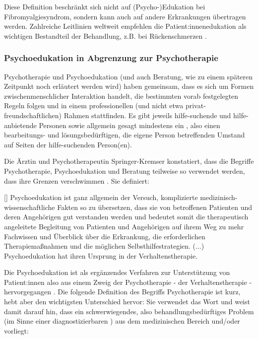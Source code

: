 \documentclass[
  twoside,
  parskip=half-,
  paper=176mm:246mm,
  BCOR=14mm,
  DIV=14,
]{scrreprt}
\makeatletter
\renewenvironment*{displayquote}
  {\begingroup\setlength{\leftmargini}{0pt}\csq@getcargs{\csq@bdquote{}{}}}
  {\csq@edquote\endgroup}
\makeatother
\begin{document}
Diese Definition beschränkt sich nicht auf (Psycho-)Edukation bei Fibromyalgiesyndrom, sondern 
kann auch auf andere Erkrankungen übertragen werden. Zahlreiche Leitlinien weltweit empfehlen die Patient:innenedukation als wichtigen Bestandteil der Behandlung, z.B. bei Rückenschmerzen \autocite[7]{HeftSchmerz1}.

\subsubsection{Psychoedukation in Abgrenzung zur Psychotherapie}

Psychotherapie und Psychoedukation (und auch Beratung, wie zu einem späteren Zeitpunkt noch erläutert werden wird) haben gemeinsam, dass es sich um Formen zwischenmenschlicher Interaktion handelt, die bestimmten vorab festgelegten Regeln folgen und in einem professionellen (und nicht etwa privat-freundschaftlichen) Rahmen stattfinden. Es gibt jeweils hilfe-suchende und hilfe-anbietende Personen sowie allgemein gesagt mindestens ein , also einen bearbeitungs- und lösungsbedürftigen, die eigene Person betreffenden Umstand auf Seiten der hilfe-suchenden Person(en). 

Die Ärztin und Psychotherapeutin Springer-Kremser konstatiert, dass die Begriffe Psychotherapie, Psychoedukation und Beratung teilweise so verwendet werden, dass ihre Grenzen verschwimmen \autocite[vgl.][897]{integrativePsycho}. Sie definiert:
  
  \begin{displayquote}[{\cite[897]{integrativePsycho}}]
    Psychoedukation ist ganz allgemein der Versuch, komplizierte medizinisch-wissenschaftliche Fakten so zu übersetzen, dass sie von betroffenen Patienten und deren Angehörigen gut verstanden werden und bedeutet somit die therapeutisch angeleitete Begleitung von Patienten und Angehörigen auf ihrem Weg zu mehr Fachwissen und Überblick über die Erkrankung, die erforderlichen Therapiemaßnahmen und die möglichen Selbsthilfestrategien. (...) Psychoedukation hat ihren Ursprung in der Verhaltenstherapie.
  \end{displayquote}
  
Die Psychoedukation ist als ergänzendes Verfahren zur Unterstützung von Patient:innen also aus einem Zweig der Psychotherapie - der Verhaltenstherapie - hervorgegangen \autocite[vgl. auch][6]{wachter}. Die folgende Definition des Begriffs Psychotherapie ist kurz, hebt aber den wichtigsten Unterschied hervor: Sie verwendet das Wort  und weist damit darauf hin, dass ein schwerwiegendes, also behandlungsbedürftiges Problem (im Sinne einer diagnostizierbaren ) aus dem medizinischen Bereich und/oder  vorliegt:
\end{document}
